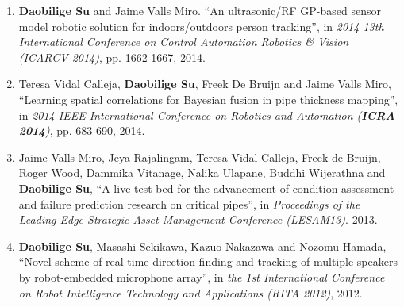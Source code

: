 \documentclass[margin,line]{res}
\newenvironment{list2}{
  \begin{list}{$\bullet$}{%
      \setlength{\itemsep}{0in}
      \setlength{\parsep}{0in} \setlength{\parskip}{0in}
      \setlength{\topsep}{0in} \setlength{\partopsep}{0in} 
      \setlength{\leftmargin}{0.2in}}}{\end{list}}
\begin{document}
\begin{resume}
\begin{enumerate}
\item {\bf Daobilige Su} and Jaime Valls Miro. ``An ultrasonic/RF GP-based sensor model robotic solution for indoors/outdoors person tracking'', in {\it 2014 13th International Conference on Control Automation Robotics \& Vision (ICARCV 2014)}, pp. 1662-1667, 2014.

\item Teresa Vidal Calleja, {\bf Daobilige Su}, Freek De Bruijn and Jaime Valls Miro, ``Learning spatial correlations for Bayesian fusion in pipe thickness mapping'', in {\it 2014 IEEE International Conference on Robotics and Automation (\textbf{ICRA 2014})}, pp. 683-690, 2014.

\item Jaime Valls Miro, Jeya Rajalingam, Teresa Vidal Calleja, Freek de Bruijn, Roger Wood, Dammika Vitanage, Nalika Ulapane, Buddhi Wijerathna and {\bf Daobilige Su}, ``A live test-bed for the advancement of condition assessment and failure prediction research on critical pipes'', in {\it Proceedings of the Leading-Edge Strategic Asset Management Conference (LESAM13)}. 2013.

\item {\bf Daobilige Su}, Masashi Sekikawa, Kazuo Nakazawa and Nozomu Hamada, ``Novel scheme of real-time direction finding and tracking of multiple speakers by robot-embedded microphone array'', in {\it the 1st International Conference on Robot Intelligence Technology and Applications (RITA 2012)}, 2012.

\end{enumerate}




%



\end{resume}
\end{document}

